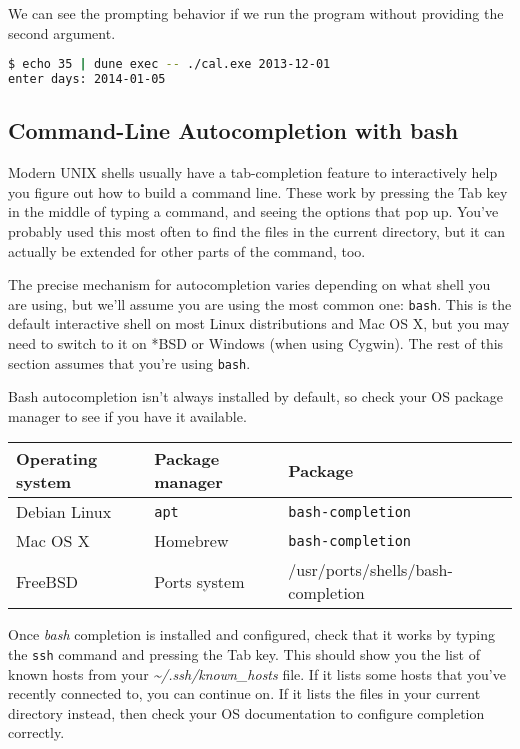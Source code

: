 We can see the prompting behavior if we run the program without
providing the second argument.

\begin{lstlisting}[language=bash]
$ echo 35 | dune exec -- ./cal.exe 2013-12-01
enter days: 2014-01-05
\end{lstlisting}

\hypertarget{command-line-auto-completion-with-bash}{%
\subsection{Command-Line Autocompletion with
bash}\label{command-line-auto-completion-with-bash}}

Modern UNIX shells usually have a tab-completion feature to
interactively help you figure out how to build a command line. These
work by pressing the Tab key in the middle of typing a command, and
seeing the options that pop up. You've probably used this most often to
find the files in the current directory, but it can actually be extended
for other parts of the command, too.

The precise mechanism for autocompletion varies depending on what shell
you are using, but we'll assume you are using the most common one:
\passthrough{\lstinline!bash!}. This is the default interactive shell on
most Linux distributions and Mac OS X, but you may need to switch to it
on *BSD or Windows (when using Cygwin). The rest of this section assumes
that you're using \passthrough{\lstinline!bash!}. 

Bash autocompletion isn't always installed by default, so check your OS
package manager to see if you have it available.

\begin{longtable}[]{@{}lll@{}}
\toprule
Operating system & Package manager & Package\tabularnewline
\midrule
\endhead
Debian Linux & \passthrough{\lstinline!apt!} &
\passthrough{\lstinline!bash-completion!}\tabularnewline
Mac OS X & Homebrew &
\passthrough{\lstinline!bash-completion!}\tabularnewline
FreeBSD & Ports system &
/usr/ports/shells/bash-completion\tabularnewline
\bottomrule
\end{longtable}

Once \emph{bash} completion is installed and configured, check that it
works by typing the \passthrough{\lstinline!ssh!} command and pressing
the Tab key. This should show you the list of known hosts from your
\emph{\textasciitilde/.ssh/known\_hosts} file. If it lists some hosts
that you've recently connected to, you can continue on. If it lists the
files in your current directory instead, then check your OS
documentation to configure completion correctly.

